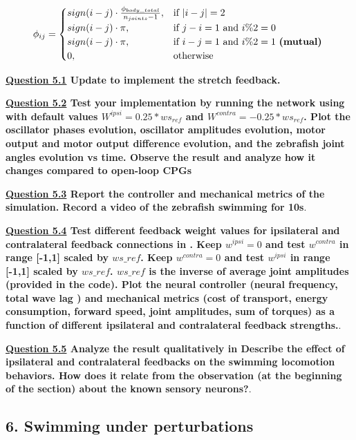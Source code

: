 \documentclass{cmc}
\begin{document}
\begin{equation}
  \label{eq:phicw}
  \phi_{ij} =
    \begin{cases}
    sign(i-j)\cdot\frac{\phi_{body\_total}}{n_{joints}-1},& \text{if } |i-j|=2 \\
    sign(i-j)\cdot\pi,&  \text{if }  j-i=1 \text{ and } i\%2=0\\
    sign(i-j)\cdot\pi,& \text{if }   i-j=1 \text{ and } i\%2=1 \text{ \textbf{(mutual)} }\\
    0, & \text{otherwise} \\
    \end{cases}
\end{equation}

\textbf{\underline{Question 5.1} Update  to implement the stretch feedback.}

\textbf{\underline{Question 5.2} Test your implementation by running the network using  with default values $W^{ipsi}=0.25 * ws_{ref}$ and $W^{contra}=-0.25 * ws_{ref}$. Plot the oscillator phases evolution, oscillator amplitudes evolution, motor output and motor output difference evolution, and the zebrafish joint angles evolution vs time. Observe the result and analyze how it changes compared to open-loop CPGs}

\textbf{\underline{Question 5.3} Report the controller and mechanical metrics of the simulation.  Record a video of the zebrafish swimming for 10s}.

\textbf{\underline{Question 5.4} Test different feedback weight values for ipsilateral and contralateral feedback connections in . Keep $w^{ipsi}=0$ and test $w^{contra}$ in range [-1,1] scaled by $ws\_ref$. Keep $w^{contra}=0$ and test $w^{ipsi}$ in range [-1,1] scaled by $ws\_ref$. $ws\_ref$ is the inverse of average joint amplitudes (provided in the code). Plot the neural controller (neural frequency, total wave lag ) and mechanical metrics (cost of transport, energy consumption, forward speed, joint amplitudes, sum of torques) as a function of different ipsilateral and contralateral feedback strengths.}.

\textbf{\underline{Question 5.5} Analyze the result qualitatively in Describe the effect of ipsilateral and contralateral feedbacks on the swimming locomotion behaviors. How does it relate from the observation (at the beginning of the section) about the known sensory neurons?}.

\subsection*{6. Swimming under perturbations}
\end{document}
